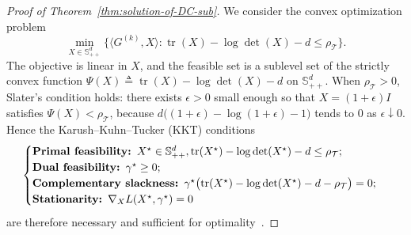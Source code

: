 \documentclass[11pt, letterpaper, oneside, reqno]{amsart}
\DeclareMathOperator{\Tr}{tr}
\newcommand{\opt}{^\star}
\newcommand{\inner}[2]{\big \langle #1, #2 \big \rangle }
\newcommand{\Let}{\triangleq}
\begin{document}
\begin{proof}[Proof of Theorem~\ref{thm:solution-of-DC-sub}]
We consider the convex optimization problem
\begin{equation}
\label{eq:DC-sub-X-proof}
\min_{X \in \mathbb S_{++}^d} \bigl\{ \inner{G^{(k)}}{X} : \Tr(X) - \log\det(X) - d \le \rho_{\mathcal T} \bigr\}.
\end{equation}
The objective is linear in $X$, and the feasible set is a sublevel set of the strictly convex function $\Psi(X) \Let \Tr(X) - \log\det(X) - d$ on $\mathbb S_{++}^d$. When $\rho_{\mathcal T} > 0$, Slater's condition holds: there exists $\epsilon > 0$ small enough so that $X = (1+\epsilon)I$ satisfies $\Psi(X) < \rho_{\mathcal T}$, because $d\bigl((1+\epsilon) - \log(1+\epsilon) - 1\bigr)$ tends to $0$ as $\epsilon \downarrow 0$. Hence the Karush--Kuhn--Tucker (KKT) conditions 
\[
\begin{cases}
\text{\textbf{Primal feasibility: }}
X\opt \in \mathbb S_{++}^d,
\Tr(X\opt) - \log\det(X\opt) - d \le \rho_{\mathcal T};\\
\text{\textbf{Dual feasibility: }}
\gamma\opt \ge 0;\\
\text{\textbf{Complementary slackness: }}
\gamma\opt \bigl(\Tr(X\opt) - \log\det(X\opt) - d - \rho_{\mathcal T} \bigr) = 0;\\
\text{\textbf{Stationarity: }}
\nabla_X L(X\opt,\gamma\opt) = 0
\end{cases}
\]
are therefore necessary and sufficient for optimality~\cite[Theorem~5.3.1]{bazaraa2006nonlinear}.


\end{proof}
\end{document}
